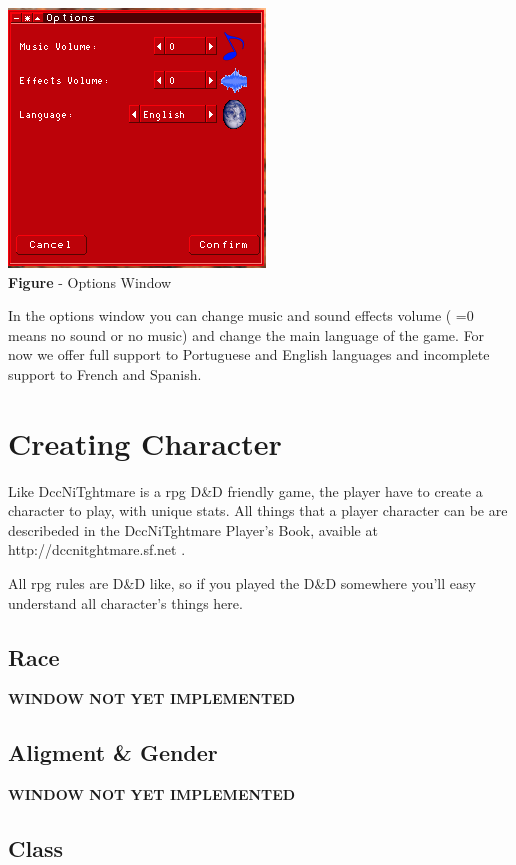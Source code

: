 \documentclass[ letterpaper,12pt]{article}
\begin{document}
\begin{center}
  \includegraphics{optionsWindow.png}
\\{\bf Figure} - Options Window
\end{center}

In the options window you can change music and sound effects volume ( =0 means no sound or no music) and change the main language of the game. For now we offer full support to Portuguese and English languages and incomplete support to French and Spanish.

\section{Creating Character}

Like DccNiTghtmare is a rpg D\&D friendly game, the player have to create a character to play, with unique stats. All things that a player character can be are describeded in the DccNiTghtmare Player's Book, avaible at http://dccnitghtmare.sf.net .

All rpg rules are D\&D like, so if you played the D\&D somewhere you'll easy understand all character's things here.

\subsection{Race}

{\bf WINDOW NOT YET IMPLEMENTED}

\subsection{Aligment \& Gender}

{\bf WINDOW NOT YET IMPLEMENTED}

\subsection{Class}
\end{document}
